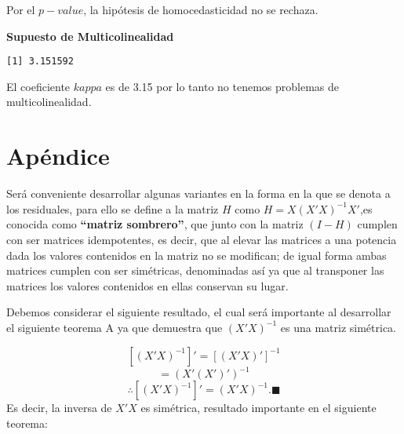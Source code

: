 \documentclass[
  a4paper,
  oneside,
  openany]{book}
\newenvironment{Shaded}{\begin{snugshade}}{\end{snugshade}}
\newcommand{\DecValTok}[1]{\textcolor[rgb]{0.00,0.00,0.81}{#1}}
\newcommand{\FunctionTok}[1]{\textcolor[rgb]{0.13,0.29,0.53}{\textbf{#1}}}
\newcommand{\NormalTok}[1]{#1}
\newcommand{\OtherTok}[1]{\textcolor[rgb]{0.56,0.35,0.01}{#1}}
\newcommand{\SpecialCharTok}[1]{\textcolor[rgb]{0.81,0.36,0.00}{\textbf{#1}}}
\begin{document}
Por el \(p-value\), la hipótesis de homocedasticidad no se rechaza.

\textbf{Supuesto de Multicolinealidad}

\begin{Shaded}
\end{Shaded}

\begin{verbatim}
[1] 3.151592
\end{verbatim}

El coeficiente \(kappa\) es de 3.15 por lo tanto no tenemos problemas de multicolinealidad.

\hypertarget{apuxe9ndice}{%
\chapter{Apéndice}\label{apuxe9ndice}}

Será conveniente desarrollar algunas variantes en la forma en la que se denota a los residuales, para ello se define a la matriz \(H\) como \(H=X(X'X)^{-1}X'\),es conocida como \textbf{``matriz sombrero''}, que junto con la matriz \((I-H)\) cumplen con ser matrices idempotentes, es decir, que al elevar las matrices a una potencia dada los valores contenidos en la matriz no se modifican; de igual forma ambas matrices cumplen con ser simétricas, denominadas así ya que al transponer las matrices los valores contenidos en ellas conservan su lugar.

Debemos considerar el siguiente resultado, el cual será importante al desarrollar el siguiente teorema A ya que demuestra que \((X'X)^{-1}\) es una matriz simétrica.

\[[(X'X)^{-1}]'=[(X'X)']^{-1}\]
\[=(X'(X')')^{-1}\]
\[\therefore [(X'X)^{-1}]'= (X'X)^{-1}. \blacksquare\]
Es decir, la inversa de \(X'X\) es simétrica, resultado importante en el siguiente teorema:
\end{document}
